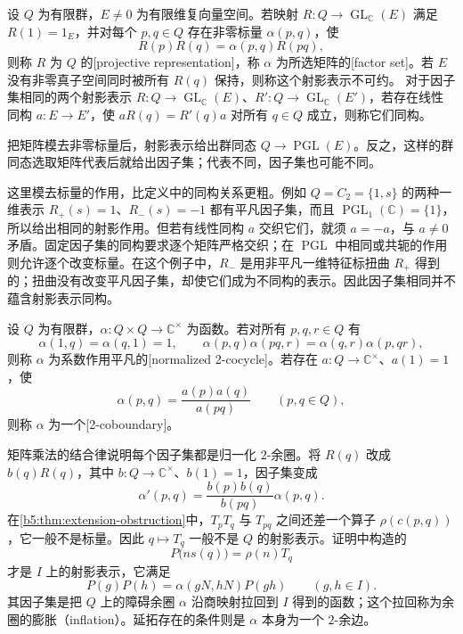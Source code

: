 \begin{definition}\label{b5:def:projective-representation}
	设 \(Q\) 为有限群，\(E\neq0\) 为有限维复向量空间。若映射 \(R:Q\to\operatorname{GL}_{\mathbb C}(E)\) 满足 \(R(1)=1_E\)，并对每个 \(p,q\in Q\) 存在非零标量 \(\alpha(p,q)\)，使
	\[
		R(p)R(q)=\alpha(p,q)R(pq),
	\]
	则称 \(R\) 为 \(Q\) 的[projective representation]，称 \(\alpha\) 为所选矩阵的[factor set]。若 \(E\) 没有非零真子空间同时被所有 \(R(q)\) 保持，则称这个射影表示不可约。 对于因子集相同的两个射影表示 \(R:Q\to\operatorname{GL}_{\mathbb C}(E)\)、\(R':Q\to\operatorname{GL}_{\mathbb C}(E')\)，若存在线性同构 \(a:E\to E'\)，使 \(aR(q)=R'(q)a\) 对所有 \(q\in Q\) 成立，则称它们同构。
\end{definition}

把矩阵模去非零标量后，射影表示给出群同态 \(Q\to\operatorname{PGL}(E)\)。反之，这样的群同态选取矩阵代表后就给出因子集；代表不同，因子集也可能不同。

\ProseParagraphBreak
这里模去标量的作用，比定义中的同构关系更粗。例如 \(Q=C_2=\{1,s\}\) 的两种一维表示 \(R_+(s)=1\)、\(R_-(s)=-1\) 都有平凡因子集，而且 \(\operatorname{PGL}_1(\mathbb C)=\{1\}\)，所以给出相同的射影作用。但若有线性同构 \(a\) 交织它们，就须 \(a=-a\)，与 \(a\ne0\) 矛盾。固定因子集的同构要求逐个矩阵严格交织；在 \(\operatorname{PGL}\) 中相同或共轭的作用则允许逐个改变标量。在这个例子中，\(R_-\) 是用非平凡一维特征标扭曲 \(R_+\) 得到的；扭曲没有改变平凡因子集，却使它们成为不同构的表示。因此因子集相同并不蕴含射影表示同构。

\begin{definition}\label{b5:def:scalar-two-cocycle}
	设 \(Q\) 为有限群，\(\alpha:Q\times Q\to\mathbb C^\times\) 为函数。若对所有 \(p,q,r\in Q\) 有
	\[
		\alpha(1,q)=\alpha(q,1)=1,\qquad \alpha(p,q)\alpha(pq,r)=\alpha(q,r)\alpha(p,qr),
	\]
	则称 \(\alpha\) 为系数作用平凡的[normalized 2-cocycle]。若存在 \(a:Q\to\mathbb C^\times\)、\(a(1)=1\)，使
	\[
		\alpha(p,q)=\frac{a(p)a(q)}{a(pq)}\qquad(p,q\in Q),
	\]
	则称 \(\alpha\) 为一个[2-coboundary]。
\end{definition}

矩阵乘法的结合律说明每个因子集都是归一化 \(2\)-余圈。将 \(R(q)\) 改成 \(b(q)R(q)\)，其中 \(b:Q\to\mathbb C^\times\)、\(b(1)=1\)，因子集变成
\begin{equation}\label{b5:eq:factor-coboundary-change}
	\alpha'(p,q)=\frac{b(p)b(q)}{b(pq)}\alpha(p,q).
\end{equation}
在\cref{b5:thm:extension-obstruction}中，\(T_pT_q\) 与 \(T_{pq}\) 之间还差一个算子 \(\rho(c(p,q))\)，它一般不是标量。因此 \(q\mapsto T_q\) 一般不是 \(Q\) 的射影表示。证明中构造的
\[
	P\bigl(ns(q)\bigr)=\rho(n)T_q
\]
才是 \(I\) 上的射影表示，它满足
\[
	P(g)P(h)=\alpha(gN,hN)P(gh)\qquad(g,h\in I).
\]
其因子集是把 \(Q\) 上的障碍余圈 \(\alpha\) 沿商映射拉回到 \(I\) 得到的函数；这个拉回称为余圈的膨胀（inflation）。延拓存在的条件则是 \(\alpha\) 本身为一个 \(2\)-余边。

